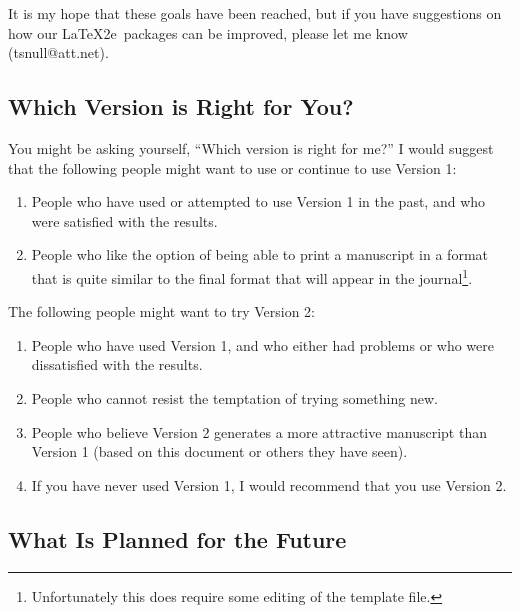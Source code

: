 \documentclass[titlepage,12pt]{article}
\begin{document}
\noindent It is my hope that these goals have been reached, but if
you have suggestions on how our \LaTeX2e\ packages can be
improved, please let me know (tsnull@att.net).

\subsection{Which Version is Right for You?}

You might be asking yourself, ``Which version is right for me?'' I
would suggest that the following people might want to use or
continue to use Version 1:

\begin{enumerate}

\item People who have used or attempted to use Version 1 in the past, and who were satisfied
with the results.

\item People who like the option of being able to print a manuscript in
a format that is quite similar to the final format that will
appear in the journal\footnote{Unfortunately this does require
some editing of the template file.}.

\end{enumerate}

\shortpage

The following people might want to try Version 2:

\begin{enumerate}

\item People who have used Version 1, and who either had
problems or who were dissatisfied with the results.

\item People who cannot resist the temptation of trying something new.

\item People who believe Version 2 generates a
more attractive manuscript than Version 1 (based on this
document or others they have seen).

\item If you have never used Version 1, I would recommend that you
use Version 2.

\end{enumerate}

\subsection{What Is Planned for the Future}\label{plans}
\end{document}
